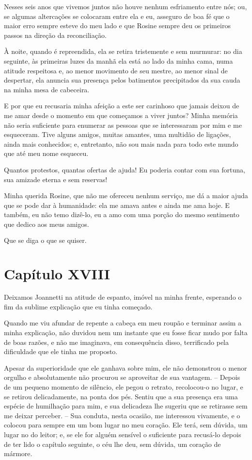  Nesses seis anos que vivemos juntos não houve nenhum esfriamento entre
nós; ou, se algumas altercações se colocaram entre ela e eu, asseguro
de boa fé que o maior erro sempre esteve do meu lado e que Rosine
sempre deu os primeiros passos na direção da reconciliação.

 À noite, quando é repreendida, ela se retira tristemente e sem
murmurar: no dia seguinte, às primeiras luzes da manhã ela está ao lado
da minha cama, numa atitude respeitosa e, ao menor movimento de seu
mestre, ao menor sinal de despertar, ela anuncia sua presença pelos
batimentos precipitados da sua cauda na minha mesa de cabeceira.

 E por que eu recusaria minha afeição a este ser carinhoso que jamais
deixou de me amar desde o momento em que começamos a viver juntos?
Minha memória não seria suficiente para enumerar as pessoas que se
interessaram por mim e me esqueceram. Tive alguns amigos, muitas
amantes, uma multidão de ligações, ainda mais conhecidos; e,
entretanto, não sou mais nada para todo este mundo que até meu nome
esqueceu.

 Quantos protestos, quantas ofertas de ajuda! Eu poderia contar com sua
fortuna, sua amizade eterna e sem reservas!

 Minha querida Rosine, que não me ofereceu nenhum serviço, me dá a maior
ajuda que se pode dar à humanidade: ela me amava antes e ainda me ama
hoje. E também, eu não temo dizê-lo, eu a amo com uma porção do mesmo
sentimento que dedico aos meus amigos.

 Que se diga o que se quiser.

\section*{Capítulo XVIII}

 Deixamos Joannetti na atitude de espanto, imóvel na minha frente,
esperando o fim da sublime explicação que eu tinha começado.

 Quando me viu afundar de repente a cabeça em meu roupão e terminar
assim a minha explicação, não duvidou nem um instante que eu fosse
ficar mudo por falta de boas razões, e não me imaginava, em
consequência disso, terrificado pela dificuldade que ele tinha me
proposto.

  Apesar da superioridade que ele ganhava sobre mim, ele não demonstrou
o menor orgulho e absolutamente não procurou se aproveitar de sua
vantagem. -- Depois de um pequeno momento de silêncio, ele pegou o
retrato, recolocou-o no lugar, e se retirou delicadamente, na ponta dos
pés. Sentiu que a sua presença era uma espécie de humilhação para mim,
e sua delicadeza lhe sugeriu que se retirasse sem me deixar perceber.
-- Sua conduta, nesta ocasião, me interessou vivamente, e o colocou
para sempre em um bom lugar no meu coração. Ele terá, sem dúvida, um
lugar no do leitor; e, se ele for alguém sensível o suficiente para
recusá-lo depois de ter lido o capítulo seguinte, o céu lhe deu, sem
dúvida, um coração de mármore.

